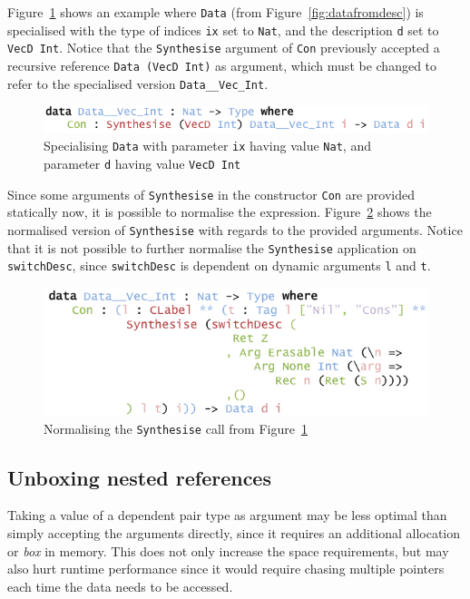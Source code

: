 \documentclass{ituthesis}
\newcommand{\ttconstructor}[1]{\textcolor{constructor-color}{\texttt{#1}}}
\newcommand{\tttype}[1]{\textcolor{type-color}{\texttt{#1}}}
\newcommand{\ttdec}[1]{\textcolor{declared-var-color}{\texttt{#1}}}
\newcommand{\ttvar}[1]{\textcolor{local-var-color}{\texttt{#1}}}
\theoremstyle{break}
\begin{document}
Figure~\ref{fig:pesp} shows an example where \tttype{Data} (from Figure~\ref{fig:datafromdesc}) is specialised with the type of indices \ttvar{ix} set to \tttype{Nat},
and the description \ttvar{d} set to \ttdec{VecD}~\tttype{Int}.
Notice that the \ttdec{Synthesise} argument of \ttvar{Con} previously accepted a recursive reference \tttype{Data}~\texttt{(}\ttdec{VecD}~\tttype{Int}\texttt{)} as argument,
which must be changed to refer to the specialised version \tttype{Data\_\_Vec\_Int}.

\begin{figure}[ht]
\begin{center}
    \includegraphics[scale=0.5]{Figures/PESpecialising.png}
\end{center}
\caption{Specialising \tttype{Data} with parameter \ttvar{ix} having value \tttype{Nat}, and parameter \ttvar{d} having value \ttdec{VecD}~\tttype{Int}}
\label{fig:pesp}
\end{figure}

Since some arguments of \ttdec{Synthesise} in the constructor \ttconstructor{Con} are provided statically now, it is possible to normalise the expression.
Figure~\ref{fig:pespext} shows the normalised version of \ttdec{Synthesise} with regards to the provided arguments.
Notice that it is not possible to further normalise the \ttdec{Synthesise} application on \ttdec{switchDesc}, since \ttdec{switchDesc} is dependent on dynamic arguments \ttvar{l} and \ttvar{t}.

\begin{figure}[ht]
\begin{center}
    \includegraphics[scale=0.5]{Figures/PESpecialisingExpansion.png}
\end{center}
\caption{Normalising the \ttdec{Synthesise} call from Figure~\ref{fig:pesp}}
\label{fig:pespext}
\end{figure}

\subsection{Unboxing nested references}
\label{sub:Unboxingnestedreferences}
Taking a value of a dependent pair type as argument may be less optimal than simply accepting the arguments directly,
since it requires an additional allocation or \textit{box} in memory.
This does not only increase the space requirements, but may also hurt runtime performance since it would require chasing multiple pointers each time the data needs to be accessed.
\end{document}
